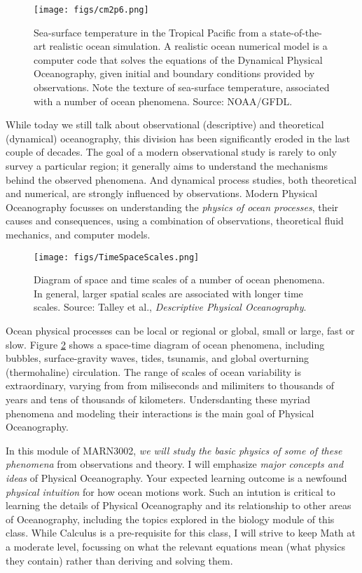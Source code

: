 \documentclass[11pt]{article}
\newcommand{\PO}{Physical Oceanography}
\begin{document}
\begin{figure}[ht]\label{cm2p6}
\centering
\texttt{[image: figs/cm2p6.png]}
\caption{\small Sea-surface temperature in the Tropical Pacific from a state-of-the-art
realistic ocean simulation. A realistic ocean numerical model is a computer code that solves
the equations of the Dynamical \PO, given initial and boundary conditions provided
by observations. Note the texture of sea-surface temperature, associated with a number of ocean
phenomena. Source: NOAA/GFDL.}
\end{figure}


While today we still talk about observational (descriptive) and theoretical
(dynamical) oceanography, this division has been significantly eroded in the
last couple of decades. The goal of a modern observational study is rarely to only survey a particular region; it generally aims to understand the mechanisms behind the observed phenomena. And dynamical process studies,
both theoretical and numerical, are strongly influenced by observations. Modern
Physical Oceanography focusses on understanding the \emph{physics of ocean processes},
their causes and consequences, using a combination of observations, theoretical
fluid mechanics,  and computer models.

\begin{figure}[ht]
\centering
\texttt{[image: figs/TimeSpaceScales.png]}
\caption{\small Diagram of space and time scales of a number of ocean phenomena.
In general, larger spatial
scales are associated with longer time scales. Source: Talley et al., \textit{Descriptive Physical Oceanography}.}
\label{scales}
\end{figure}

Ocean physical processes can be local or regional or global, small or large, fast
or slow. Figure \ref{scales} shows a space-time diagram of ocean phenomena, including
bubbles, surface-gravity waves, tides, tsunamis, and global overturning
(thermohaline) circulation. The range of scales of ocean variability is extraordinary,
varying from from miliseconds and milimiters to thousands of years and tens of thousands of
kilometers. Undersdanting these myriad phenomena and modeling their interactions is
the main goal of Physical Oceanography.

In this module of MARN3002, \emph{we will study the basic physics of some of these phenomena
} from observations and theory. I will emphasize \emph{major concepts and ideas} of \PO. Your
expected learning outcome is a newfound \emph{physical intuition} for how ocean motions work. Such an intution is critical to learning the details of \PO{} and its relationship to other areas of Oceanography, including the topics explored in the biology module of this class. While Calculus is a pre-requisite for this class, I will strive to keep Math at a moderate level, focussing on what the relevant equations mean (what physics they contain) rather than deriving and solving them.
\end{document}
